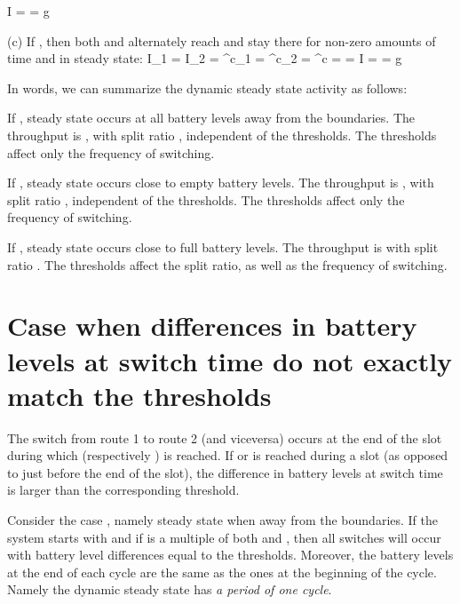 \documentclass[12 pt]{article}
\newcommand{\debug}[1]{\mbox{\tt #1}}
\renewcommand{\debug}[1]{}              \newcommand{\cmd}[1]{}
\newcommand{\msec}[2]{\renewcommand{\sname}{}\section[#1
	\debug{\fbox {#2}}]{#1 \cmd{msec} \dlabelx{#2}}\markboth{\today}{Sec. \thesection}}
\begin{document}
    \SE
    \SB
    I = \text{    ;   }
    \gamma = g
    \SE
\item{(c)} If   , then both  and  alternately reach  and stay there for non-zero amounts of time and in steady state:
    \SB
    I_1 = \text{    ;   }
    I_2 = \text{    ;   }
    \gamma^c_1 = \text{    ;   }
    \gamma^c_2 = 
    \SE
    \SB
    \gamma^c = \text{    ;   }
     = \text{    ;   }
    I = \text{    ;   }
    \gamma = g
    \SE
\dE

\eE
\TE
In words, we can summarize the dynamic steady state activity as follows:
\eB
\item If , steady state occurs at all battery levels away from the boundaries. The throughput is , with split ratio , independent of the thresholds.  The thresholds affect only the frequency of switching.
\item If , steady state occurs close to empty battery levels.  The throughput is , with split ratio , independent of the thresholds.  The thresholds affect only the frequency of switching.
\item If , steady state occurs close to full battery levels.  The throughput is  with split ratio .  The thresholds affect the split ratio, as well as the frequency of switching.
\eE

\msec{Case when differences in battery levels at switch time do not exactly match the thresholds}{relax}

The switch from route 1 to route 2 (and viceversa) occurs at the end of the slot during which  (respectively ) is reached.  If  or  is reached during a slot (as opposed to just before the end of the slot), the difference in battery levels at switch time is larger than the corresponding threshold.

Consider the case , namely steady state when away from the boundaries.   If the system starts with  and if  is a multiple of both  and , then all switches will occur with battery level differences equal to the thresholds. Moreover, the battery levels at the end of each cycle are the same as the ones at the beginning of the cycle.  Namely the dynamic steady state has \emph{a period of one cycle}.
\end{document}
